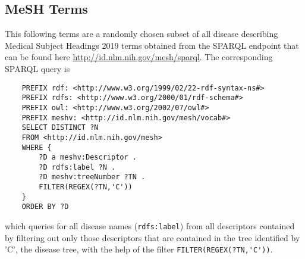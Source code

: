 \newpage
\subsection{MeSH Terms}
\label{app:terms}

This following terms are a randomly chosen subset of all disease describing Medical Subject Headings 2019 terms obtained from the SPARQL endpoint 
that can be found here \url{http://id.nlm.nih.gov/mesh/sparql}. The corresponding SPARQL query is
\begin{verbatim}
    PREFIX rdf: <http://www.w3.org/1999/02/22-rdf-syntax-ns#>
    PREFIX rdfs: <http://www.w3.org/2000/01/rdf-schema#>
    PREFIX owl: <http://www.w3.org/2002/07/owl#>
    PREFIX meshv: <http://id.nlm.nih.gov/mesh/vocab#>
    SELECT DISTINCT ?N
    FROM <http://id.nlm.nih.gov/mesh>
    WHERE { 
        ?D a meshv:Descriptor .
        ?D rdfs:label ?N .
        ?D meshv:treeNumber ?TN .
        FILTER(REGEX(?TN,'C'))
    }
    ORDER BY ?D
\end{verbatim}
which queries for all disease names (\verb!rdfs:label!) from all descriptors contained by filtering out only those descriptors that are contained in the
tree identified by 'C', the disease tree, with the help of the filter \verb!FILTER(REGEX(?TN,'C'))!.

